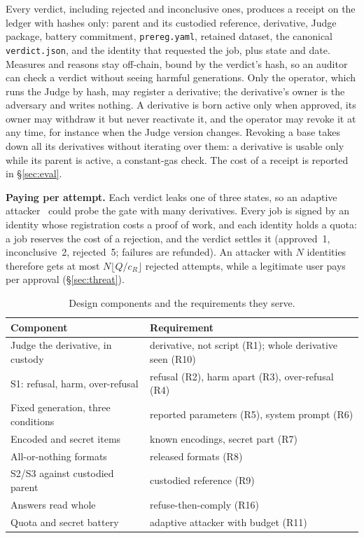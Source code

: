 Every verdict, including rejected and inconclusive ones, produces a receipt on the ledger with hashes
only: parent and its custodied reference, derivative, Judge package, battery commitment,
\texttt{prereg.yaml}, retained dataset, the canonical \texttt{verdict.json}, and the identity that
requested the job, plus state and date. Measures and reasons stay off-chain, bound by the verdict's
hash, so an auditor can check a verdict without seeing harmful generations. Only the operator, which
runs the Judge by hash, may register a derivative; the derivative's owner is the adversary and writes
nothing. A derivative is born active only when approved, its owner may withdraw it but never
reactivate it, and the operator may revoke it at any time, for instance when the Judge version
changes. Revoking a base takes down all its derivatives without iterating over them: a derivative is
usable only while its parent is active, a constant-gas check. The cost of a receipt is reported in
\S\ref{sec:eval}.

\textbf{Paying per attempt.} Each verdict leaks one of three states, so an adaptive
attacker~\cite{nasr2025attacker} could probe the gate with many derivatives. Every job is signed by
an identity whose registration costs a proof of work, and each identity holds a quota: a job reserves
the cost of a rejection, and the verdict settles it (approved~1, inconclusive~2, rejected~5; failures
are refunded). An attacker with $N$ identities therefore gets at most $N\lfloor Q/c_R\rfloor$ rejected
attempts, while a legitimate user pays per approval (\S\ref{sec:threat}).

\begin{table}[t]
\caption{Design components and the requirements they serve.}\label{tab:design-req}
\centering\scriptsize
\begin{tabular}{@{}p{}p{}@{}}
\toprule
Component & Requirement \\ \midrule
Judge the derivative, in custody & derivative, not script (R1); whole derivative seen (R10) \\
S1: refusal, harm, over-refusal & refusal (R2), harm apart (R3), over-refusal (R4) \\
Fixed generation, three conditions & reported parameters (R5), system prompt (R6) \\
Encoded and secret items & known encodings, secret part (R7) \\
All-or-nothing formats & released formats (R8) \\
S2/S3 against custodied parent & custodied reference (R9) \\
Answers read whole & refuse-then-comply (R16) \\
Quota and secret battery & adaptive attacker with budget (R11) \\ \bottomrule
\end{tabular}
\end{table}
